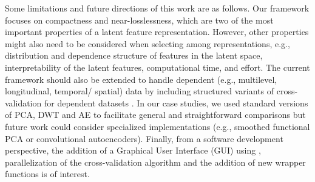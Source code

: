 Some limitations and future directions of this work are as follows.
Our framework focuses on compactness and near-losslessness, which are two of the most important properties of a latent feature representation.
However, other properties might also need to be considered when selecting among representations, e.g., distribution and dependence structure of features in the latent space, interpretability of the latent features, computational time, and effort.
The current framework should also be extended to handle dependent (e.g., multilevel, longitudinal, temporal/ spatial) data by including structured variants of cross-validation for dependent datasets
\parencite{bergmeir_note_2018, hornung_evaluating_2023, roberts_cross-validation_2017}.
In our case studies, we used standard versions of PCA, DWT and AE to facilitate general and straightforward comparisons but future work could consider specialized implementations (e.g., smoothed functional PCA or convolutional autoencoders). 
Finally, from a software development perspective, the addition of a Graphical User Interface (GUI) using  \parencite{chang_shiny_2021}, parallelization of the cross-validation algorithm and the addition of new wrapper functions is of interest.


